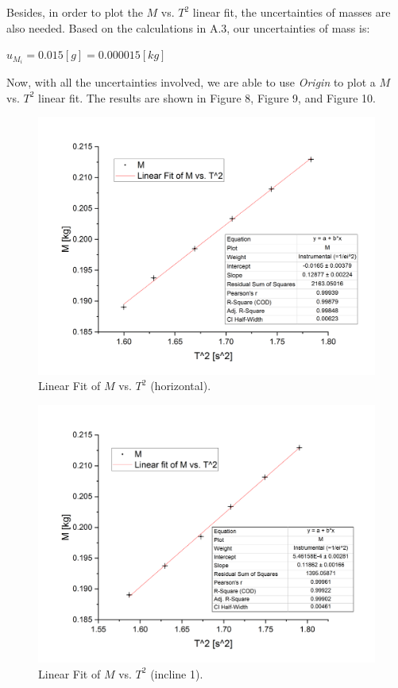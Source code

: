 \documentclass[a4paper,12pt]{article}
\begin{document}
\par Besides, in order to plot the $M$ vs. $T^2$ linear fit, the uncertainties of masses are also needed. Based on the calculations in A.3, our uncertainties of mass is: 
\begin{center}
$ u_{M_i} = 0.015[g] = 0.000015 [kg] $
\end{center}

\par Now, with all the uncertainties involved, we are able to use \textit{Origin} to plot a $M$ vs. $T^2$ linear fit. The results are shown in Figure 8, Figure 9, and Figure 10.

\begin{figure}[p] 
    \centering
    \includegraphics[width=1\textwidth]{pic4} 
    \caption{Linear Fit of $M$ vs. $T^2$ (horizontal).} 
\end{figure}

\begin{figure}[p] 
    \centering
    \includegraphics[width=1\textwidth]{pic5} 
    \caption{Linear Fit of $M$ vs. $T^2$ (incline 1).} 
\end{figure}
\end{document}
